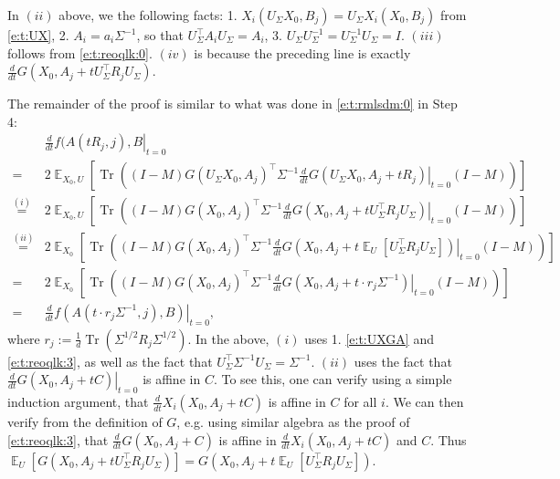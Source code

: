\documentclass{article}
\DeclareMathOperator{\E}{\mathbb{E}}
\DeclareMathOperator{\tr}{Tr}
\newcommand*\lrb[1]{\left[ #1 \right]}
\newcommand*\lrp[1]{\left( #1 \right)}
\newcommand*\at[2]{\left.#1\right|_{#2}}
\newcommand{\US}{U_\Sigma}
\begin{document}
In $(ii)$ above, we  the following facts: 1. $X_i(\US X_0, B_j) = \US X_i(X_0, B_j)$ from \eqref{e:t:UX}, 2. $A_i = a_i \Sigma^{-1}$, so that $\US^{\top} A_i \US = A_i$, 3. $\US\US^{-1} = \US^{-1} \US = I$. $(iii)$ follows from \eqref{e:t:reoqlk:0}. $(iv)$ is because the preceding line is exactly $\frac{d}{dt} G(X_0, A_j + t \US^{\top} R_j \US)$.
\fi


The remainder of the proof is similar to what was done in \eqref{e:t:rmlsdm:0} in Step 4:
\begin{align*}
& \at{\frac{d}{dt} f(A(tR_j, j), B}{t=0}\\
=& 2\E_{X_0, U} \lrb{\tr\lrp{\lrp{I-M} G(\US X_0, A_j )^\top \Sigma^{-1} \at{\frac{d}{dt} G(\US X_0, A_j + t R_j)}{t=0} \lrp{I-M}}}\\
\overset{(i)}{=}& 2\E_{X_0,U} \lrb{\tr\lrp{\lrp{I-M} G( X_0, A_j )^\top \Sigma^{-1} \at{\frac{d}{dt} G(X_0, A_j + t \US^{\top} R_j \US)}{t=0} \lrp{I-M}}}\\
\overset{(ii)}{=}& 2\E_{X_0} \lrb{\tr\lrp{\lrp{I-M} G( X_0, A_j )^\top \Sigma^{-1} \at{\frac{d}{dt} G(X_0, A_j + t \E_U\lrb{\US^{\top} R_j \US} )}{t=0} \lrp{I-M}}}\\
=& 2\E_{X_0} \lrb{\tr\lrp{\lrp{I-M} G( X_0, A_j )^\top \Sigma^{-1} \at{\frac{d}{dt} G(X_0, A_j + t \cdot r_j \Sigma^{-1})}{t=0} \lrp{I-M}}}\\
=& \at{\frac{d}{dt} f(A(t\cdot r_j \Sigma^{-1},j), B)}{t=0},
\end{align*}
where $r_j := \frac{1}{d} \tr\lrp{\Sigma^{1/2} R_j \Sigma^{1/2}}$. In the above, $(i)$ uses 1. \eqref{e:t:UXGA} and \eqref{e:t:reoqlk:3}, as well as the fact that $\US^\top \Sigma^{-1} \US = \Sigma^{-1}$. $(ii)$ uses the fact that $\at{\frac{d}{dt} G(X_0, A_j + t C)}{t=0}$ is affine in $C$. To see this, one can verify using a simple induction argument, that $\frac{d}{dt} X_i(X_0, A_j + tC)$  is affine in $C$ for all $i$. We can then verify from the definition of $G$, e.g. using similar algebra as the proof of \eqref{e:t:reoqlk:3}, that $\frac{d}{dt} G(X_0, A_j + C)$ is affine in $\frac{d}{dt} X_i(X_0, A_j + t C)$ and $C$. Thus $\E_U\lrb{G(X_0, A_j + t \US^{\top} R_j \US)} = G(X_0, A_j + t \E_U\lrb{\US^{\top} R_j \US})$.
\end{document}
